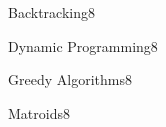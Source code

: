 \documentclass[a4paper]{article}
\begin{document}
\header
\begin{problem}{Backtracking}{8}
\end{problem}

\begin{problem}{Dynamic Programming}{8}
\begin{acode}
\end{acode}
\end{problem}

\begin{problem}{Greedy Algorithms}{8}
\begin{acode}
\end{acode}
\end{problem}

\begin{problem}{Matroids}{8}
\begin{acode}
\end{acode}
\end{problem}
\end{document}
